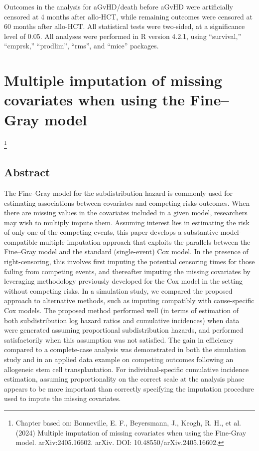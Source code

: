 \documentclass[
  letterpaper,
  paper=240mm:170mm,
  twoside=true,
  open=right,
  fontsize=10pt,
  pagesize=false,
  BCOR=15mm,
  DIV=14,
  headinclude=true,
  footinclude=false,
  headsepline=on]{scrbook}
\newcommand\blfootnote[1]{%
  \begingroup
  \renewcommand\thefootnote{}\footnote{#1}%
  \addtocounter{footnote}{-1}%
  \endgroup
}
\begin{document}
Outcomes in the analysis for aGvHD/death before aGvHD were artificially
censored at 4 months after allo-HCT, while remaining outcomes were
censored at 60 months after allo-HCT. All statistical tests were
two-sided, at a significance level of 0.05. All analyses were performed
in R version 4.2.1, using ``survival,'' ``cmprsk,'' ``prodlim'',
``rms'', and ``mice'' packages.


\chapter{Multiple imputation of missing covariates when using the
Fine--Gray model}\label{sec-chap-FG-MI}

\blfootnote{Chapter based on: Bonneville, E. F., Beyersmann, J., Keogh, R. H., et al. (2024) Multiple imputation of missing covariates when using the Fine-Gray model. arXiv:2405.16602. arXiv. DOI: 10.48550/arXiv.2405.16602.}

\clearpage

\section*{Abstract}\label{abstract-2}


The Fine--Gray model for the subdistribution hazard is commonly used for
estimating associations between covariates and competing risks outcomes.
When there are missing values in the covariates included in a given
model, researchers may wish to multiply impute them. Assuming interest
lies in estimating the risk of only one of the competing events, this
paper develops a substantive-model-compatible multiple imputation
approach that exploits the parallels between the Fine--Gray model and
the standard (single-event) Cox model. In the presence of
right-censoring, this involves first imputing the potential censoring
times for those failing from competing events, and thereafter imputing
the missing covariates by leveraging methodology previously developed
for the Cox model in the setting without competing risks. In a
simulation study, we compared the proposed approach to alternative
methods, such as imputing compatibly with cause-specific Cox models. The
proposed method performed well (in terms of estimation of both
subdistribution log hazard ratios and cumulative incidences) when data
were generated assuming proportional subdistribution hazards, and
performed satisfactorily when this assumption was not satisfied. The
gain in efficiency compared to a complete-case analysis was demonstrated
in both the simulation study and in an applied data example on competing
outcomes following an allogeneic stem cell transplantation. For
individual-specific cumulative incidence estimation, assuming
proportionality on the correct scale at the analysis phase appears to be
more important than correctly specifying the imputation procedure used
to impute the missing covariates.
\end{document}
